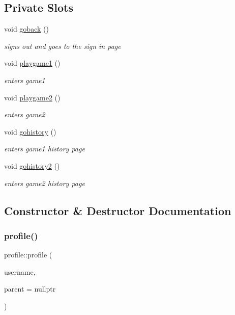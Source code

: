 \subsection*{Private Slots}
\begin{DoxyCompactItemize}
\item 
void \hyperlink{classprofile_a0ba746f5f77f499dfc9ef25d0a6e88e2}{goback} ()
\begin{DoxyCompactList}\small\item\em signs out and goes to the sign in page \end{DoxyCompactList}\item 
void \hyperlink{classprofile_a6255c697ba58203b5d9834fea1329cb1}{playgame1} ()
\begin{DoxyCompactList}\small\item\em enters game1 \end{DoxyCompactList}\item 
void \hyperlink{classprofile_a89dd2d07162af36d2aeebc485b1e878c}{playgame2} ()
\begin{DoxyCompactList}\small\item\em enters game2 \end{DoxyCompactList}\item 
void \hyperlink{classprofile_a7b83e5727f3cc2e1fcfd8ff6883681d9}{gohistory} ()
\begin{DoxyCompactList}\small\item\em enters game1 history page \end{DoxyCompactList}\item 
void \hyperlink{classprofile_ae4957e01d43effcf134009d1e302d166}{gohistory2} ()
\begin{DoxyCompactList}\small\item\em enters game2 history page \end{DoxyCompactList}\end{DoxyCompactItemize}


\subsection{Constructor \& Destructor Documentation}
\mbox{\label{classprofile_a345e4de8245d251526e2e908deb323e0}} 
\subsubsection{\texorpdfstring{profile()}{profile()}}
{\footnotesize\ttfamily profile\+::profile (\begin{DoxyParamCaption}\item[{Q\+String \&}]{username,  }\item[{Q\+Widget $\ast$}]{parent = {\ttfamily nullptr} }\end{DoxyParamCaption})\hspace{0.3cm}{\ttfamily [explicit]}}

